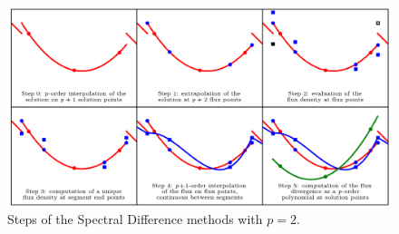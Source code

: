       \begin{figure}
        \centering
        \includegraphics{figures/sd_scheme.png}
        \caption{Steps of the Spectral Difference methods with $p = 2$.}
        \label{fig:sd_scheme}
      \end{figure}

